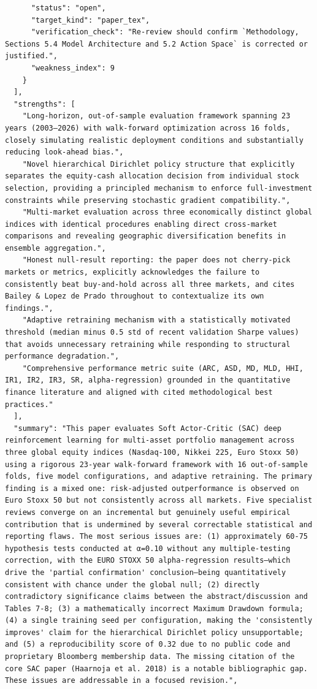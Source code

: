 \documentclass[11pt]{article}
\begin{document}
\begin{verbatim}
      "status": "open",
      "target_kind": "paper_tex",
      "verification_check": "Re-review should confirm `Methodology, Sections 5.4 Model Architecture and 5.2 Action Space` is corrected or justified.",
      "weakness_index": 9
    }
  ],
  "strengths": [
    "Long-horizon, out-of-sample evaluation framework spanning 23 years (2003–2026) with walk-forward optimization across 16 folds, closely simulating realistic deployment conditions and substantially reducing look-ahead bias.",
    "Novel hierarchical Dirichlet policy structure that explicitly separates the equity-cash allocation decision from individual stock selection, providing a principled mechanism to enforce full-investment constraints while preserving stochastic gradient compatibility.",
    "Multi-market evaluation across three economically distinct global indices with identical procedures enabling direct cross-market comparisons and revealing geographic diversification benefits in ensemble aggregation.",
    "Honest null-result reporting: the paper does not cherry-pick markets or metrics, explicitly acknowledges the failure to consistently beat buy-and-hold across all three markets, and cites Bailey & Lopez de Prado throughout to contextualize its own findings.",
    "Adaptive retraining mechanism with a statistically motivated threshold (median minus 0.5 std of recent validation Sharpe values) that avoids unnecessary retraining while responding to structural performance degradation.",
    "Comprehensive performance metric suite (ARC, ASD, MD, MLD, HHI, IR1, IR2, IR3, SR, alpha-regression) grounded in the quantitative finance literature and aligned with cited methodological best practices."
  ],
  "summary": "This paper evaluates Soft Actor-Critic (SAC) deep reinforcement learning for multi-asset portfolio management across three global equity indices (Nasdaq-100, Nikkei 225, Euro Stoxx 50) using a rigorous 23-year walk-forward framework with 16 out-of-sample folds, five model configurations, and adaptive retraining. The primary finding is a mixed one: risk-adjusted outperformance is observed on Euro Stoxx 50 but not consistently across all markets. Five specialist reviews converge on an incremental but genuinely useful empirical contribution that is undermined by several correctable statistical and reporting flaws. The most serious issues are: (1) approximately 60-75 hypothesis tests conducted at α=0.10 without any multiple-testing correction, with the EURO STOXX 50 alpha-regression results—which drive the 'partial confirmation' conclusion—being quantitatively consistent with chance under the global null; (2) directly contradictory significance claims between the abstract/discussion and Tables 7-8; (3) a mathematically incorrect Maximum Drawdown formula; (4) a single training seed per configuration, making the 'consistently improves' claim for the hierarchical Dirichlet policy unsupportable; and (5) a reproducibility score of 0.32 due to no public code and proprietary Bloomberg membership data. The missing citation of the core SAC paper (Haarnoja et al. 2018) is a notable bibliographic gap. These issues are addressable in a focused revision.",

\end{verbatim}
\end{document}
